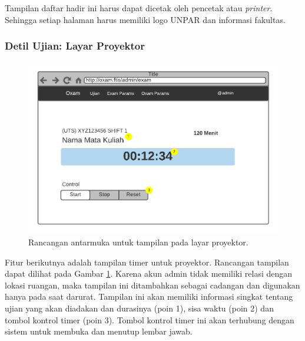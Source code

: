     Tampilan daftar hadir ini harus dapat dicetak oleh pencetak atau \textit{printer}. Sehingga setiap halaman
    harus memiliki logo UNPAR dan informasi fakultas.
    
\subsubsection{Detil Ujian: Layar Proyektor}
    \begin{figure}
        \centering
        \includegraphics{Gambar/mockups/Mockup--Admin - Layar Proyektor.pdf}
        \caption{Rancangan antarmuka untuk tampilan pada layar proyektor.}
        \label{fig:mockup_admin_det_projector}
    \end{figure}
    
    Fitur berikutnya adalah tampilan timer untuk proyektor. Rancangan tampilan dapat dilihat pada
    Gambar \ref{fig:mockup_admin_det_projector}. Karena akun admin tidak memiliki relasi dengan 
    lokasi ruangan, maka tampilan ini ditambahkan sebagai cadangan dan digunakan hanya pada saat darurat.
    Tampilan ini akan memiliki informasi singkat tentang ujian yang akan diadakan dan durasinya (poin 1),
    sisa waktu (poin 2) dan tombol kontrol timer (poin 3).
    Tombol kontrol timer ini akan terhubung dengan sistem untuk membuka dan menutup lembar jawab.
    

